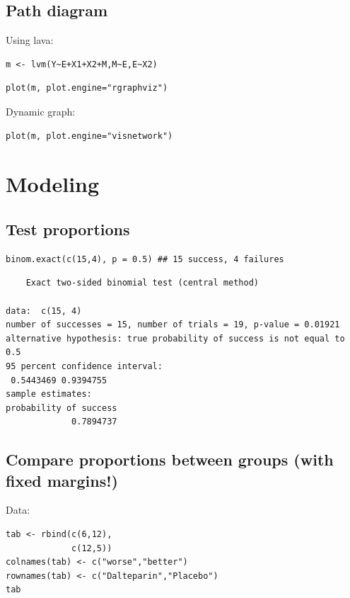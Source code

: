 \documentclass{article}
\begin{document}
\subsection{Path diagram}
\label{sec:org7b9f08f}
Using lava:
\lstset{language=r,label= ,caption= ,captionpos=b,numbers=none}
\begin{lstlisting}
m <- lvm(Y~E+X1+X2+M,M~E,E~X2)
\end{lstlisting}

\lstset{language=r,label= ,caption= ,captionpos=b,numbers=none}
\begin{lstlisting}
plot(m, plot.engine="rgraphviz")
\end{lstlisting}

Dynamic graph:
\lstset{language=r,label= ,caption= ,captionpos=b,numbers=none}
\begin{lstlisting}
plot(m, plot.engine="visnetwork")
\end{lstlisting}

\section{Modeling}
\label{sec:org7c67f60}
\subsection{Test proportions}
\label{sec:org27d8e33}
\lstset{language=r,label= ,caption= ,captionpos=b,numbers=none}
\begin{lstlisting}
binom.exact(c(15,4), p = 0.5) ## 15 success, 4 failures
\end{lstlisting}

\begin{verbatim}
	Exact two-sided binomial test (central method)

data:  c(15, 4)
number of successes = 15, number of trials = 19, p-value = 0.01921
alternative hypothesis: true probability of success is not equal to 0.5
95 percent confidence interval:
 0.5443469 0.9394755
sample estimates:
probability of success 
             0.7894737
\end{verbatim}

\subsection{Compare proportions between groups (with fixed margins!)}
\label{sec:orge6c599a}

Data:
\lstset{language=r,label= ,caption= ,captionpos=b,numbers=none}
\begin{lstlisting}
tab <- rbind(c(6,12),
			 c(12,5))
colnames(tab) <- c("worse","better")
rownames(tab) <- c("Dalteparin","Placebo")
tab
\end{lstlisting}
\end{document}
